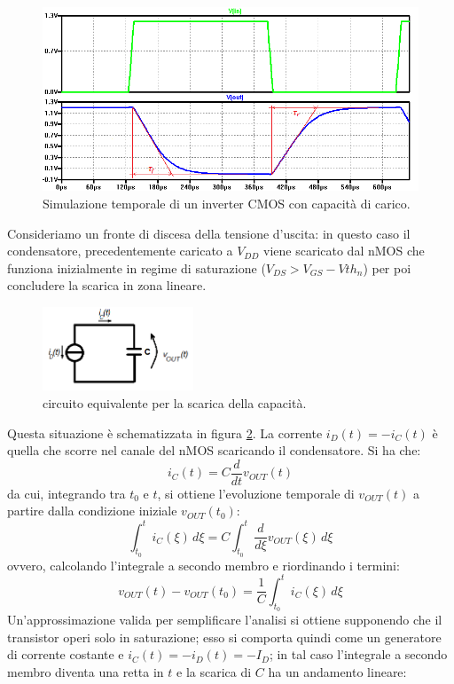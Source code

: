 \begin{figure}[hbt!]
	\centering
	\includegraphics[width=1\textwidth]{figure/Sim_InverterCMOS(chiaro)WithNotes.png}
	\caption{Simulazione temporale di un inverter CMOS con capacità di carico.}
	\label{fig:fig_sim_inverterCMOS}
\end{figure}

Consideriamo un fronte di discesa della tensione d'uscita: in questo caso il condensatore, precedentemente caricato a $V_{DD}$ viene scaricato dal nMOS che funziona inizialmente in regime di saturazione ($V_{DS}>V_{GS}-V{th_n}$) per poi concludere la scarica in zona lineare. 

\begin{figure}[hbt!]
	\centering
	\includegraphics[width=0.4\textwidth]{figure/Sch_scaricaC.png}
	\caption{circuito equivalente per la scarica della capacità.}
	\label{fig:fig_sch_scaricaC}
\end{figure}

Questa situazione è schematizzata in figura \ref{fig:fig_sch_scaricaC}. La corrente $i_D(t) = - i_C(t)$ è quella che scorre nel canale del nMOS scaricando il condensatore. Si ha che:
\begin{equation}
i_C(t) = C \frac{d}{dt}v_{OUT}(t)
\label{eq:eq_condensatore}
\end{equation}
da cui, integrando tra $t_0$ e $t$, si ottiene l'evoluzione temporale di $v_{OUT}(t)$ a partire dalla condizione iniziale $v_{OUT}(t_0)$:
\begin{equation}
\int_{t_0}^{t} i_C(\xi)\, d\xi = C \int_{t_0}^{t} \frac{d}{d\xi}v_{OUT}(\xi)\, d\xi
\label{eq:eq_condensatoreIntegrata}
\end{equation}
ovvero, calcolando l'integrale a secondo membro e riordinando i termini:
\begin{equation}
v_{OUT}(t) - v_{OUT}(t_0) = \frac{1}{C}\int_{t_0}^{t} i_C(\xi)\, d\xi
\label{eq:eq_condensatoreSoluzione}
\end{equation}
Un'approssimazione valida per semplificare l'analisi si ottiene supponendo che il transistor operi solo in saturazione; esso si comporta quindi come un generatore di corrente costante e $i_C(t) = - i_D(t) = - I_D$; in tal caso l'integrale a secondo membro diventa una retta in $t$ e la scarica di $C$ ha un andamento lineare:

